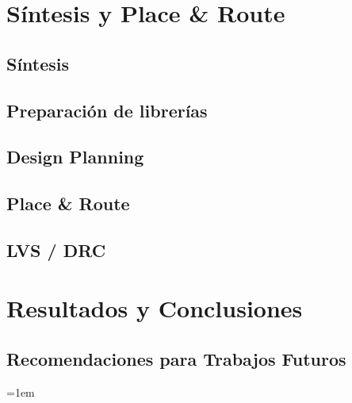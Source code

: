 \documentclass[a4paper, twoside, 11pt]{report}
\begin{document}
\FloatBarrier
\chapter{Síntesis y Place \& Route}

\FloatBarrier
\section{Síntesis}

\FloatBarrier
\section{Preparación de librerías}

\FloatBarrier
\section{Design Planning}

\FloatBarrier
\section{Place \& Route}

\FloatBarrier
\section{LVS / DRC}


\FloatBarrier
\chapter{Resultados y Conclusiones}

\FloatBarrier
\section{Recomendaciones para Trabajos Futuros}


\FloatBarrier
\newpage

\emergencystretch=1em
\printbibliography
\end{document}
